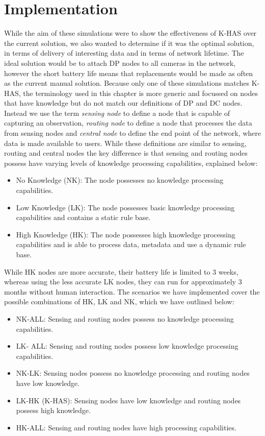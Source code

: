 \section{Implementation}\label{sim:imp}
	While the aim of these simulations were to show the effectiveness of K-HAS over the current solution, we also wanted to determine if it was the optimal solution, in terms of delivery of interesting data and in terms of network lifetime. The ideal solution would be to attach DP nodes to all cameras in the network, however the short battery life means that replacements would be made as often as the current manual solution. Because only one of these simulations matches K-HAS, the terminology used in this chapter is more generic and focussed on nodes that have knowledge but do not match our definitions of DP and DC nodes. Instead we use the term \textit{sensing node} to define a node that is capable of capturing an observation, \textit{routing node} to define a node that processes the data from sensing nodes and \textit{central node} to define the end point of the network, where data is made available to users. While these definitions are similar to sensing, routing and central nodes the key difference is that sensing and routing nodes possess have varying levels of knowledge processing capabilities, explained below:
	
	\begin{itemize}
		\item No Knowledge (NK): The node possesses no knowledge processing capabilities.
		\item Low Knowledge (LK): The node possesses basic knowledge processing capabilities and contains a static rule base.
		\item High Knowledge (HK): The node possesses high knowledge processing capabilities and is able to process data, metadata and use a dynamic rule base.
	\end{itemize}
	
	While HK nodes are more accurate, their battery life is limited to 3 weeks, whereas using the less accurate LK nodes, they can run for approximately 3 months without human interaction. The scenarios we have implemented cover the possible combinations of HK, LK and NK, which we have outlined below:
	
	\begin{itemize}
		\item NK-ALL: Sensing and routing nodes possess no knowledge processing capabilities.
		\item LK- ALL: Sensing and routing nodes possess low knowledge processing capabilities.
		\item NK-LK: Sensing nodes possess no knowledge processing and routing nodes have low knowledge.
		\item LK-HK (K-HAS): Sensing nodes have low knowledge and routing nodes possess high knowledge.
		\item HK-ALL: Sensing and routing nodes have high processing capabilities.
	\end{itemize}

